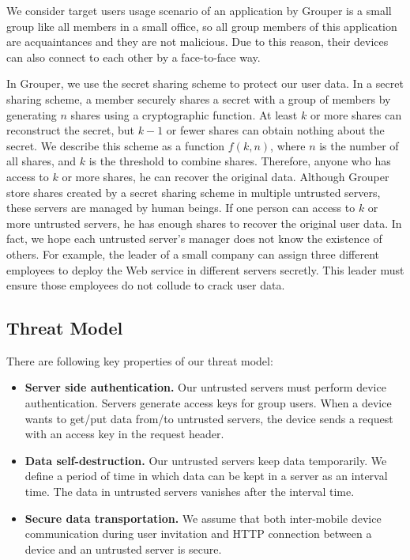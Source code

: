 \documentclass[twocolumn,10pt]{article}
\begin{document}
We consider target users usage scenario of an application by Grouper is a small group like all members in a small office, so all group members of this application are acquaintances and they are not malicious. Due to this reason, their devices can also connect to each other by a face-to-face way.

In Grouper, we use the secret sharing scheme to protect our user data. In a secret sharing scheme, a member securely shares a secret with a group of members by generating $n$ shares using a cryptographic function\cite{smith2013layered}. 
At least $k$ or more shares can reconstruct the secret, but $k-1$ or fewer shares can obtain nothing about the secret\cite{pang2005new}. 
We describe this scheme as a function $f(k, n)$, where $n$ is the number of all shares, and $k$ is the threshold to combine shares. 
Therefore, anyone who has access to $k$ or more shares, he can recover the original data. Although Grouper store shares created by a secret sharing scheme in multiple untrusted servers, these servers are managed by human beings. If one person can access to $k$ or more untrusted servers, he has enough shares to recover the original user data. In fact, we hope each untrusted server's manager does not know the existence of others. For example, the leader of a small company can assign three different employees to deploy the Web service in different servers secretly. This leader must ensure those employees do not collude to crack user data.

\subsection{Threat Model}

There are following key properties of our threat model:

\begin{itemize}
	\setlength{\itemsep}{1pt}
	\setlength{\parskip}{0pt}
	\setlength{\parsep}{0pt}
	\item \textbf{Server side authentication.}
	Our untrusted servers must perform device authentication. 
	Servers generate access keys for group users. 
	When a device wants to get/put data from/to untrusted servers, the device sends a request with an access key in the request header.
	\item \textbf{Data self-destruction.} 
	Our untrusted servers keep data temporarily.
	We define a period of time in which data can be kept in a server as an interval time. 
	The data in untrusted servers vanishes after the interval time.
	\item \textbf{Secure data transportation.}
	We assume that both inter-mobile device communication during user invitation and HTTP connection between a device and an untrusted server is secure. 
\end{itemize}
\end{document}
